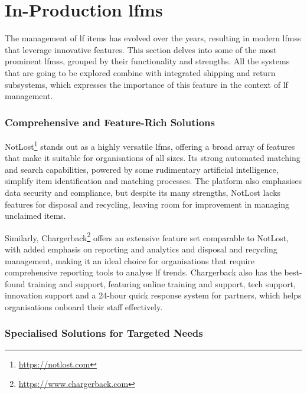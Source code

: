 
\section{In-Production \acl{lfms}} \label{sec:in-production-solutions}

The management of \ac{lf} items has evolved over the years, resulting in modern \acp{lfms} that leverage innovative features. This section delves into some of the most prominent \acp{lfms}, grouped by their functionality and strengths. All the systems that are going to be explored combine with integrated shipping and return subsystems, which expresses the importance of this feature in the context of \ac{lf} management.

\subsubsection{Comprehensive and Feature-Rich Solutions} \label{subsubsec:comprehensive-solutions}

NotLost\footnote{\url{https://notlost.com}} stands out as a highly versatile \ac{lfms}, offering a broad array of features that make it suitable for organisations of all sizes. Its strong automated matching and search capabilities, powered by some rudimentary artificial intelligence, simplify item identification and matching processes. The platform also emphasises data security and compliance, but despite its many strengths, NotLost lacks features for disposal and recycling, leaving room for improvement in managing unclaimed items.

Similarly, Chargerback\footnote{\url{https://www.chargerback.com}} offers an extensive feature set comparable to NotLost, with added emphasis on reporting and analytics and disposal and recycling management, making it an ideal choice for organisations that require comprehensive reporting tools to analyse \ac{lf} trends. Chargerback also has the best-found training and support, featuring online training and support, tech support, innovation support and a 24-hour quick response system for partners, which helps organisations onboard their staff effectively.

\subsubsection{Specialised Solutions for Targeted Needs} \label{subsubsec:specialised-solutions}

